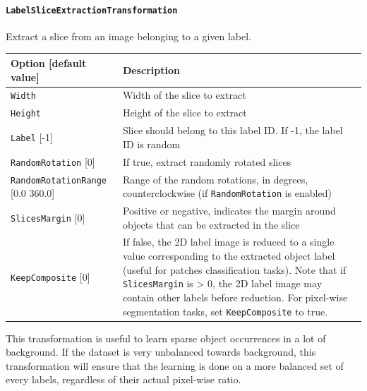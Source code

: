 \documentclass[a4paper,11pt,oneside]{article}
\newcommand{\iponly}{\reversemarginpar
    \marginnote{\color{listletiblue}\normalfont\scriptsize
    {\ttfamily{}\hyperref[sec:N2D2-IP]{\color{listletiblue}N2D2 IP}} \emph{only}}}
\begin{document}
\paragraph{\texorpdfstring{%
\lstinline[basicstyle=\ttfamily\bfseries]!LabelSliceExtractionTransformation!%
\protect\iponly}{LabelSliceExtractionTransformation}}
Extract a slice from an image belonging to a given label.

\begin{center}
 \begin{tabular}{| p{5cm} | p{10cm} | }
 \hline
 Option [default value] & Description\\
 \hline\hline
  \cellcolor{requiredcolor}\lstinline!Width! & Width of the slice to extract \\
  \cellcolor{requiredcolor}\lstinline!Height! & Height of the slice to
  extract \\
  \lstinline!Label! [-1] & Slice should belong to this label ID. If -1, the
  label ID is random \\
  \lstinline!RandomRotation! [0] & If true, extract randomly rotated slices \\
  \lstinline!RandomRotationRange! [0.0 360.0] & Range of the random rotations, in degrees, counterclockwise (if \lstinline!RandomRotation! is enabled) \\
  \lstinline!SlicesMargin! [0] & Positive or negative, indicates the margin around objects that can be extracted in the slice \\
  \lstinline!KeepComposite! [0] & If false, the 2D label image is reduced to a single value corresponding to the extracted object label (useful for patches classification tasks). Note that if \lstinline!SlicesMargin! is > 0, the 2D label image may contain other labels before reduction. For pixel-wise segmentation tasks, set \lstinline!KeepComposite! to true. \\
 \hline
\end{tabular}
\end{center}

This transformation is useful to learn sparse object occurrences in a lot of background. If the dataset is very unbalanced towards background, this transformation will ensure that the learning is done on a more balanced set of every labels, regardless of their actual pixel-wise ratio.
\end{document}
